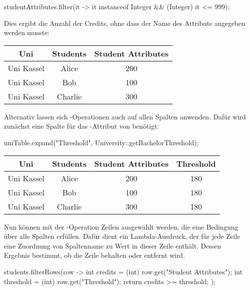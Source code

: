 \begin{jcodeblock}
    studentAttributes.filter(it -> it instanceof Integer && (Integer) it <= 999);
\end{jcodeblock}

Dies ergibt die Anzahl der Credits, ohne dass der Name des Attributs angegeben werden musste:

\begin{tabular}{|c|c|c|}
    \hline
    \textbf{Uni} & \textbf{Students} & \textbf{Student Attributes} \\
    \hline
    Uni Kassel & Alice   & 200 \\
    Uni Kassel & Bob     & 100 \\
    Uni Kassel & Charlie & 300 \\
    \hline
\end{tabular}

Alternativ lassen sich -Operationen auch auf allen Spalten anwenden.
Dafür wird zunächst eine Spalte für das -Attribut von  benötigt:

\begin{jcodeblock}
    uniTable.expand("Threshold", University::getBachelorThreshold);
\end{jcodeblock}

\begin{tabular}{|c|c|c|c|}
    \hline
    \textbf{Uni} & \textbf{Students} & \textbf{Student Attributes} & \textbf{Threshold} \\
    \hline
    Uni Kassel & Alice   & 200 & 180 \\
    Uni Kassel & Bob     & 100 & 180 \\
    Uni Kassel & Charlie & 300 & 180 \\
    \hline
\end{tabular}

Nun können mit der -Operation Zeilen ausgewählt werden, die eine Bedingung über alle Spalten erfüllen.
Dafür dient ein Lambda-Ausdruck, der für jede Zeile eine Zuordnung von Spaltenname zu Wert in dieser Zeile enthält.
Dessen Ergebnis bestimmt, ob die Zeile behalten oder entfernt wird.

\begin{jcodeblock}
    students.filterRows(row -> {
        int credits = (int) row.get("Student Attributes");
        int threshold = (int) row.get("Threshold");
        return credits >= threshold;
    });
\end{jcodeblock}

